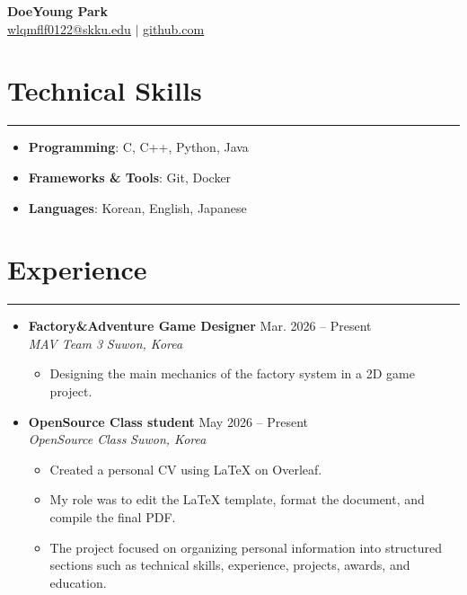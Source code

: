 \documentclass[letterpaper, 10pt]{article}
\begin{document}
\begin{center}
\textbf{\LARGE DoeYoung Park} \\ \vspace{2pt}
\href{mailto:wlqmflf0122@skku.edu}{\underline{wlqmflf0122@skku.edu}} $|$
\href{https://github.com/dyp0122}{\underline{github.com}}
\end{center}
\section*{Technical Skills}
\hrule
\vspace{4pt}
\begin{itemize}
\item[] \textbf{Programming}: %
C, C++, Python, Java
\item[] \textbf{Frameworks \& Tools}: %
Git, Docker
\item[] \textbf{Languages}: %
Korean, English, Japanese
\end{itemize}
\section*{Experience}
\hrule
\vspace{4pt}
\begin{itemize}
\item[]
\textbf{Factory\&Adventure Game Designer} \hfill Mar. 2026 -- Present \\ %
\textit{MAV Team 3} \hfill \textit{Suwon, Korea}
\begin{itemize}
\item Designing the main mechanics of the factory system in a 2D game project.
\end{itemize}
\item[]
\textbf{OpenSource Class student} \hfill May 2026 -- Present \\ %
\textit{OpenSource Class} \hfill \textit{Suwon, Korea}
\begin{itemize}
\item Created a personal CV using LaTeX on Overleaf. 
\item My role was to edit the LaTeX template, format the document, and compile the final PDF.
\item The project focused on organizing personal information into structured sections such as technical skills, experience, projects, awards, and education. 
\end{itemize}
\end{itemize}
\end{document}
